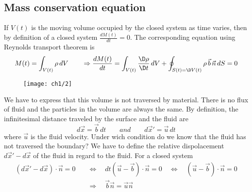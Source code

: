 	\subsection{Mass conservation equation}
	If $V(t)$ is the moving volume occupied by the closed system as time varies, then by definition of a closed system $\frac{dM(t)}{dt} = 0$. The corresponding equation using Reynolds transport theorem is 
	\begin{equation}
		M(t) = \int _{V(t)} \rho\, dV \qquad \Rightarrow \frac{dM(t)}{dt} = \int _{V(t)} \frac{\D \rho}{\D t}\, dV + \oint _{S(t) = \D V(t)} \rho\, \vec{b}\, \vec{n}\, dS = 0
	\end{equation}
	\begin{wrapfigure}[9]{l}{3cm}
	\vspace{-5mm}
	\texttt{[image: ch1/2]}
	\label{fig:1.2}
	\end{wrapfigure}
	We have to express that this volume is not traversed by material. There is no flux of fluid and the particles in the volume are always the same. By definition, the infinitesimal distance traveled by the surface and the fluid are
	\begin{equation}
		d\vec{x} = \vec{b}\, dt \qquad and \qquad d\vec{x}' = \vec{u}\, dt
	\end{equation}	 
	where $\vec{u}$ is the fluid velocity. Under wich condition do we know that the fluid has not traversed the boundary? We have to define the relative dispolacement $d\vec{x}'-d\vec{x}$ of the fluid in regard to the fluid. For a closed system 
	\begin{equation}
	\begin{aligned}
		(d\vec{x}'-d\vec{x})\cdot \vec{n} = 0 \quad &\Leftrightarrow \quad dt (\vec{u}-\vec{b})\cdot \vec{n} = 0 \quad \Leftrightarrow \quad (\vec{u}-\vec{b})\cdot \vec{n} = 0 \\
		&\Rightarrow \quad \vec{b} \vec{n} = \vec{u} \vec{n}
		\end{aligned}
	\end{equation}
	\begin{center}
	\end{center}
	

